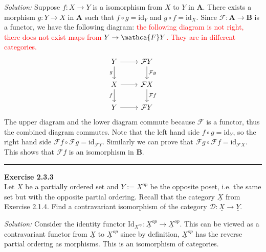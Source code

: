 \documentclass[a4paper, 12pt]{article}
\newenvironment{problem}[2][Exercise]
    { \begin{mdframed}[backgroundcolor=gray!20] \textbf{#1 #2} \\}
    {  \end{mdframed}}
\newenvironment{solution}
    {\textit{Solution:}}
    {}
\begin{document}
\begin{solution}
Suppose \(f:X\rightarrow Y\) is a isomorphism from \(X\) to \(Y\) in \(\mathbf{A}\). There exists a morphism \(g:Y\rightarrow X\) in \(\mathbf{A}\) such that \(f\circ g=\text{id}_Y\) and \(g\circ f=\text{id}_X\). Since 
\(\mathcal{F}:\mathbf{A}\rightarrow \mathbf{B}\) is a functor, we have the following diagram: \textcolor{red}{the following diagram is not right, there does not exist maps from \(Y\rightarrow \mathca{F}Y\). They are in different categories.}
$$\begin{tikzcd}
	Y & {\mathcal{F}Y} \\
	X & {\mathcal{F}X} \\
	Y & {\mathcal{F}Y}
	\arrow[from=1-1, to=1-2]
	\arrow["g"', from=1-1, to=2-1]
	\arrow["{\mathcal{F}g}", from=1-2, to=2-2]
	\arrow[from=2-1, to=2-2]
	\arrow["f"', from=2-1, to=3-1]
	\arrow["{\mathcal{F}f}", from=2-2, to=3-2]
	\arrow[from=3-1, to=3-2]
\end{tikzcd}$$
The upper diagram and the lower diagram commute because \(\mathcal{F}\) is a functor, thus the combined diagram commutes. Note that the left hand side \(f\circ g=\text{id}_Y\), so 
the right hand side \(\mathcal{F}f\circ \mathcal{F}g=\text{id}_{\mathcal{F}Y}\). Similarly we can prove that \(\mathcal{F}g\circ \mathcal{F}f=\text{id}_{\mathcal{F}X}\). This shows that 
\(\mathcal{F}f\) is an isomorphism in \(\mathbf{B}\).
\end{solution}
\\ 
\noindent\rule{7in}{2.8pt}
\begin{problem}{2.3.3}
Let \(X\) be a partially ordered set and \(Y:=X^{op}\) be the opposite poset, i.e. the same set but with the opposite partial ordering. Recall that 
the category \(\underline{X}\) from Exercise 2.1.4. Find a contravariant isomorphism of the category \(\mathcal{D}:\underline{X}\rightarrow \underline{Y}\).
\end{problem}
\begin{solution}
Consider the identity functor \(\text{Id}_{X^{op}}:\underline{X}^{op}\rightarrow \underline{X}^{op}\). This can be viewed as a contravariant functor from \(\underline{X}\) to \(\underline{X}^{op}\) since by 
definition, \(\underline{X}^{op}\) has the reverse partial ordering as morphisms. This is an isomorphism of categories. 
\end{solution}
\end{document}
